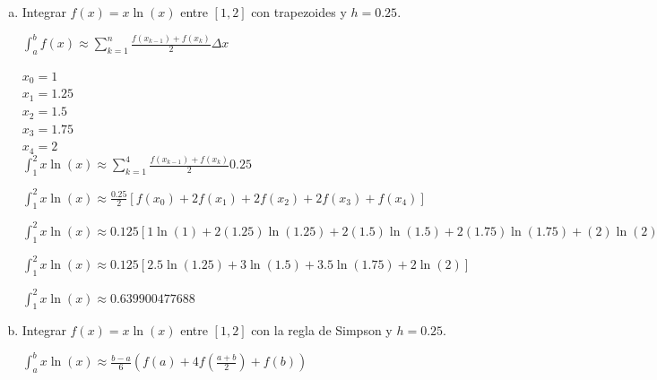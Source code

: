 \documentclass[english,notitlepage,letterpaper, 10pt]{article} %
\begin{document}
\begin{enumerate}[a)]
  \item Integrar $f(x) = x \ln(x)$ entre $[1,2]$ con trapezoides y $h = 0.25$.
  
  \begin{center}
    \begin{math}
      \displaystyle \int_a^b f(x) \approx \sum_{k=1}^{n} \frac{f(x_{k-1})+f(x_k)}{2} \Delta x
    \end{math}

    $x_0 = 1$ \\
    $x_1 = 1.25$ \\
    $x_2 = 1.5$ \\
    $x_3 = 1.75$ \\
    $x_4 = 2$ \\

    \begin{math}
      \displaystyle \int_1^2 x\ln(x) \approx \sum_{k=1}^{4} \frac{f(x_{k-1})+f(x_k)}{2} 0.25
    \end{math}

    \begin{math}
      \displaystyle \int_1^2 x\ln(x) \approx \frac{0.25}{2} [f(x_0)+2f(x_1)+2f(x_2)+2f(x_3)+f(x_4)]
    \end{math}
    
    \begin{math}
      \displaystyle \int_1^2 x\ln(x) \approx 0.125[1\ln(1)+2(1.25)\ln(1.25)+2(1.5)\ln(1.5)+2(1.75)\ln(1.75)+(2)\ln(2)]
    \end{math}

    \begin{math}
      \displaystyle \int_1^2 x\ln(x) \approx  0.125[2.5\ln(1.25)+3\ln(1.5)+3.5\ln(1.75)+2\ln(2)]
    \end{math}

    \begin{math}
      \displaystyle \int_1^2 x\ln(x) \approx 0.639900477688
    \end{math}
  \end{center}
  
  \item Integrar $f(x) = x \ln(x)$ entre $[1,2]$ con la regla de Simpson y $h = 0.25$.

  \begin{center}
    \begin{math}
      \displaystyle \int_a^b x\ln(x) \approx \frac{b-a}{6} \left( f(a) + 4f\left( \frac{a+b}{2} \right) + f(b) \right)
    \end{math}


\end{center}
\end{enumerate}
\end{document}
